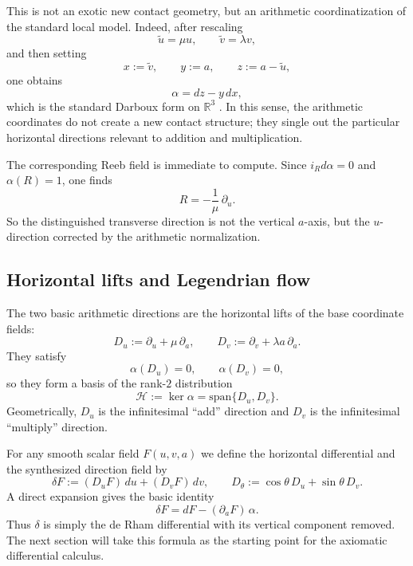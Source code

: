 This is not an exotic new contact geometry, but an arithmetic coordinatization of the standard local model. Indeed, after rescaling
\[
    \tilde u=\mu u,
    \qquad
    \tilde v=\lambda v,
\]
and then setting
\[
    x:=\tilde v,
    \qquad
    y:=a,
    \qquad
    z:=a-\tilde u,
\]
one obtains
\[
    \alpha = dz-y\,dx,
\]
which is the standard Darboux form on $\mathbb{R}^3$ \cite{Darboux1882Pfaff,Geiges2008IntroContact}. In this sense, the arithmetic coordinates do not create a new contact structure; they single out the particular horizontal directions relevant to addition and multiplication.

The corresponding Reeb field is immediate to compute. Since $i_Rd\alpha=0$ and $\alpha(R)=1$, one finds
\[
    R=-\frac{1}{\mu}\,\partial_u.
\]
So the distinguished transverse direction is not the vertical $a$-axis, but the $u$-direction corrected by the arithmetic normalization.

\subsection{Horizontal lifts and Legendrian flow}
\label{subsec:geometry_on_ker_alpha}

The two basic arithmetic directions are the horizontal lifts of the base coordinate fields:
\begin{equation}\label{eq:2}
D_u:=\partial_u+\mu\,\partial_a,
\qquad
D_v:=\partial_v+\lambda a\,\partial_a.
\end{equation}
They satisfy
\[
    \alpha(D_u)=0,
    \qquad
    \alpha(D_v)=0,
\]
so they form a basis of the rank-$2$ distribution
\[
    \mathcal H:=\ker\alpha=\mathrm{span}\{D_u,D_v\}.
\]
Geometrically, $D_u$ is the infinitesimal ``add'' direction and $D_v$ is the infinitesimal ``multiply'' direction.

For any smooth scalar field $F(u,v,a)$ we define the horizontal differential and the synthesized direction field by
\begin{equation}\label{eq:3}\tag{3}
\delta F := (D_uF)\,du + (D_vF)\,dv,
\qquad
D_\theta:=\cos\theta\,D_u+\sin\theta\,D_v.
\end{equation}
A direct expansion gives the basic identity
\[
    \delta F = dF-(\partial_aF)\,\alpha.
\]
Thus $\delta$ is simply the de Rham differential with its vertical component removed. The next section will take this formula as the starting point for the axiomatic differential calculus.

